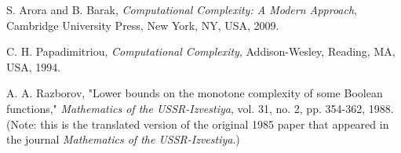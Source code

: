 \begin{thebibliography}{99.}%
%
%
S. Arora and B. Barak, \textit{Computational Complexity: A Modern Approach}, Cambridge University Press, New York, NY, USA, 2009.

C. H. Papadimitriou, \textit{Computational Complexity}, Addison-Wesley, Reading, MA, USA, 1994.


A. A. Razborov, "Lower bounds on the monotone complexity of some Boolean functions," \textit{Mathematics of the USSR-Izvestiya}, vol. 31, no. 2, pp. 354-362, 1988. (Note: this is the translated version of the original 1985 paper that appeared in the journal \textit{Mathematics of the USSR-Izvestiya}.) 
 
 

\end{thebibliography}
